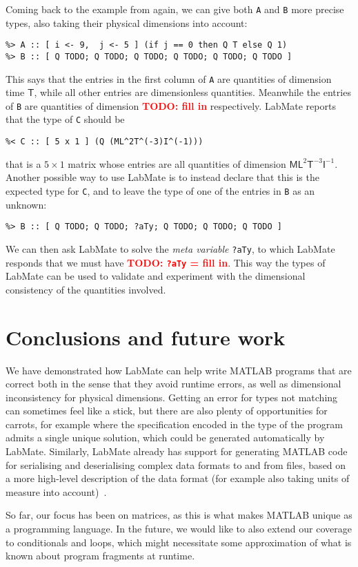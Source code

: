 \documentclass{ws-procs9x6}
\newcommand{\remph}{\emph}
\newcommand{\todo}[1]{\textcolor{red}{\textbf{TODO: #1}}}
\begin{document}
Coming back to the example from  again, we can give both \texttt{A} and \texttt{B} more precise types, also taking their physical dimensions into account:
\begin{verbatim}
%> A :: [ i <- 9,  j <- 5 ] (if j == 0 then Q T else Q 1)
%> B :: [ Q TODO; Q TODO; Q TODO; Q TODO; Q TODO; Q TODO ]
\end{verbatim}
This says that the entries in the first column of \texttt{A} are quantities of dimension time $\mathsf{T}$, while all other entries are dimensionless quantities. Meanwhile the entries of \texttt{B} are quantities of dimension \todo{fill in} respectively. LabMate reports that the type of \texttt{C} should be
\begin{verbatim}
%< C :: [ 5 x 1 ] (Q (ML^2T^(-3)I^(-1)))
\end{verbatim}
that is a $5 \times 1$ matrix whose entries are all quantities of dimension $\mathsf{ML}^2\mathsf{T}^{-3}\mathsf{I}^{-1}$. Another possible way to use LabMate is to instead declare that this is the expected type for \texttt{C}, and to leave the type of one of the entries in \texttt{B} as an unknown:
\begin{verbatim}
%> B :: [ Q TODO; Q TODO; ?aTy; Q TODO; Q TODO; Q TODO ]
\end{verbatim}
We can then ask LabMate to solve the \remph{meta variable} \texttt{?aTy}, to which LabMate responds that we must have \todo{\texttt{?aTy} = fill in}. This way the types of LabMate can be used to validate and experiment with the dimensional consistency of the quantities involved.



\section{Conclusions and future work}

We have demonstrated how LabMate can help write MATLAB programs that are correct both in the sense that they avoid runtime errors, as well as dimensional inconsistency for physical dimensions.
%
Getting an error for types not matching can sometimes feel like a stick, but there are also plenty of opportunities for carrots, for example where the specification encoded in the type of the program admits a single unique solution, which could be generated automatically by LabMate.
%
Similarly, LabMate already has support for generating MATLAB code for serialising and deserialising complex data formats to and from files, based on a more high-level description of the data format (for example also taking units of measure into account)~\cite{mgen}.

So far, our focus has been on matrices, as this is what makes MATLAB
unique as a programming language.
%
In the future, we would like to also extend our coverage to
conditionals and loops, which might necessitate some approximation of
what is known about program fragments at runtime.



\end{document}
